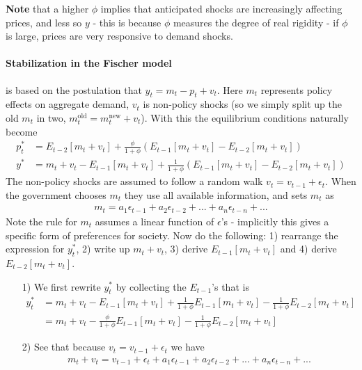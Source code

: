 \documentclass[12pt, a4paper]{article}
\begin{document}
\begin{spacing}{1.213}
\textbf{Note} that a higher $\phi$ implies that anticipated shocks are increasingly affecting prices, and less so $y$ - this is because $\phi$ measures the degree of real rigidity - if $\phi$ is large, prices are very responsive to demand shocks.

\paragraph{Stabilization in the Fischer model}
is based on the postulation that $y_t = m_t - p_t + v_t$. Here $m_t$ represents policy effects on aggregate demand, $v_t$ is non-policy shocks (so we simply split up the old $m_t$ in two, $m_t^{\textrm{old}} = m_t^{\textrm{new}} + v_t$). With this the equilibrium conditions naturally become
\begin{align*}
p_t^* &= E_{t-2}[m_t + v_t] + \frac{\phi}{1+\phi} ( E_{t-1}[m_t + v_t] - E_{t-2}[m_t + v_t])
\\
y^* &= m_t + v_t - E_{t-1}[m_t + v_t] + \frac{1}{1+ \phi}(E_{t-1}[m_t+ v_t] -E_{t-2}[m_t+ v_t])
\end{align*}
The non-policy shocks are assumed to follow a random walk $v_t = v_{t-1} + \epsilon_t$. When the government chooses $m_t$ they use all available information, and sets $m_t$ as
\begin{align*}
m_t = a_1 \epsilon_{t-1} + a_2 \epsilon_{t-2} + ... + a_{n} \epsilon_{t-n} + ...
\end{align*}
Note the rule for $m_t$ assumes a linear function of $\epsilon$'s - implicitly this gives a specific form of preferences for society. Now do the following: 1) rearrange the expression for $y^*_t$, 2) write up $m_t+v_t$, 3) derive $E_{t-1}[m_t + v_t]$ and 4) derive $E_{t-2}[m_t + v_t]$.

\begin{itemize}
\item[1)] We first rewrite $y_t^*$ by collecting the $E_{t-1}$'s that is
\begin{align*}
y_t^* &= m_t + v_t - E_{t-1}[m_t + v_t] + \frac{1}{1+ \phi}E_{t-1}[m_t+ v_t] - \frac{1}{1+ \phi}E_{t-2}[m_t+ v_t] \\
&= m_t + v_t - \frac{\phi}{1+ \phi} E_{t-1}[m_t + v_t] - \frac{1}{1+ \phi} E_{t-2}[m_t + v_t]
\end{align*}

\item[2)] See that because $v_t = v_{t-1} + \epsilon_t$ we have
\begin{align*}
m_t + v_t = v_{t-1} + \epsilon_t + a_1 \epsilon_{t-1} + a_2 \epsilon_{t-2} + ... + a_{n} \epsilon_{t-n} + ...
\end{align*}


\end{itemize}
\end{spacing}
\end{document}
